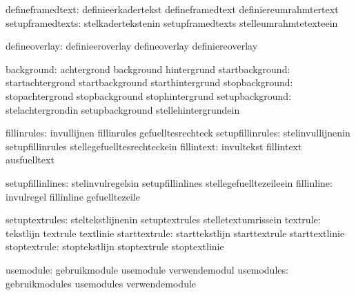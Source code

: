              defineframedtext:  definieerkadertekst          defineframedtext
                                definiereumrahmtertext
             setupframedtexts:  stelkadertekstenin           setupframedtexts
                                stelleumrahmtetexteein

                defineoverlay:  definieeroverlay             defineoverlay
                                definiereoverlay

                   background:  achtergrond                  background
                                hintergrund
              startbackground:  startachtergrond             startbackground
                                starthintergrund
               stopbackground:  stopachtergrond              stopbackground
                                stophintergrund
              setupbackground:  stelachtergrondin            setupbackground
                                stellehintergrundein

                  fillinrules:  invullijnen                  fillinrules
                                gefuelltesrechteck
             setupfillinrules:  stelinvullijnenin            setupfillinrules
                                stellegefuelltesrechteckein
                   fillintext:  invultekst                   fillintext
                                ausfuelltext

             setupfillinlines:  stelinvulregelsin            setupfillinlines
                                stellegefuelltezeileein
                   fillinline:  invulregel                   fillinline
                                gefuelltezeile

               setuptextrules:  steltekstlijnenin            setuptextrules
                                stelletextumrissein
                     textrule:  tekstlijn                    textrule
                                textlinie
                starttextrule:  starttekstlijn               starttextrule
                                starttextlinie
                 stoptextrule:  stoptekstlijn                stoptextrule
                                stoptextlinie

                    usemodule:  gebruikmodule                usemodule
                                verwendemodul
                   usemodules:  gebruikmodules               usemodules
                                verwendemodule

